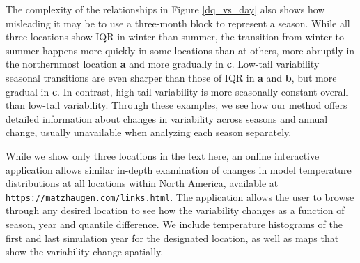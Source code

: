 \documentclass{ametsoc}
\begin{document}
%



The complexity of the relationships in Figure \ref{dq_vs_day} also shows how misleading it may be to use a three-month block to represent a season. While all three locations show IQR in winter than summer, the transition from winter to summer happens more quickly in some locations than at others, more abruptly in the northernmost location \textbf{a} and more gradually in \textbf{c}. Low-tail variability seasonal transitions are even sharper than those of IQR in \textbf{a} and \textbf{b}, but more gradual in \textbf{c}.
In contrast, high-tail variability is more seasonally constant overall than low-tail variability. 
Through these examples, we see how our method offers detailed information about changes in variability across seasons and annual change, usually unavailable when analyzing each season separately. 

While we show only three locations in the text here, an online interactive application allows similar in-depth examination of changes in model temperature distributions at all locations within North America, available at {\small\texttt{https://matzhaugen.com/links.html}}. The application allows the user to browse through any desired location to see how the variability changes as a function of season, year and quantile difference. We include temperature histograms of the first and last simulation year for the designated location, as well as maps that show the variability change spatially. 
\end{document}

